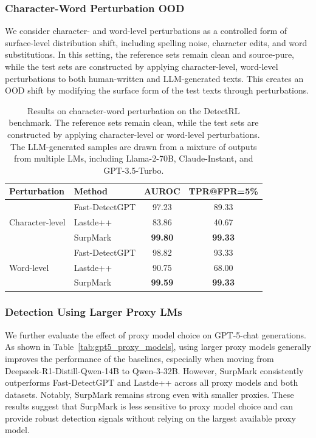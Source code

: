 \documentclass{article}
\theoremstyle{plain}
\theoremstyle{definition}
\theoremstyle{remark}
\begin{document}
\subsubsection{\quad Character-Word Perturbation OOD}
\label{app:cw-perturbation-ood}
We consider character- and word-level perturbations as a controlled form of surface-level distribution shift, including spelling noise, character edits, and word substitutions. In this setting, the reference sets remain clean and source-pure, while the test sets are constructed by applying character-level, word-level perturbations to both human-written and LLM-generated texts. This creates an OOD shift by modifying the surface form of the test texts through perturbations.

\begin{table}[htbp]
\centering
\scriptsize
\caption{Results on character-word perturbation on the DetectRL benchmark. The reference sets remain clean, while the test sets are constructed by applying character-level or word-level perturbations. The LLM-generated samples are drawn from a mixture of outputs from multiple LMs, including Llama-2-70B, Claude-Instant, and GPT-3.5-Turbo.}
\label{table:char_word_perturbation}
\begin{tabular}{llcc}
\toprule
Perturbation & Method & AUROC & TPR@FPR=5\% \\
\midrule
\multirow{3}{*}{Character-level}
& Fast-DetectGPT & 97.23 & 89.33 \\
& Lastde++ & 83.86 & 40.67 \\
& SurpMark & \textbf{99.80} & \textbf{99.33} \\
\midrule
\multirow{3}{*}{Word-level}
& Fast-DetectGPT & 98.82 & 93.33 \\
& Lastde++ & 90.75 & 68.00 \\
& SurpMark & \textbf{99.59} & \textbf{99.33} \\
\bottomrule
\end{tabular}
\end{table}

\subsubsection{Detection Using Larger Proxy LMs}
We further evaluate the effect of proxy model choice on GPT-5-chat generations. 
As shown in Table~\ref{tab:gpt5_proxy_models}, using larger proxy models generally improves the performance of the baselines, especially when moving from Deepseek-R1-Distill-Qwen-14B to Qwen-3-32B. 
However, SurpMark consistently outperforms Fast-DetectGPT and Lastde++ across all proxy models and both datasets. 
Notably, SurpMark remains strong even with smaller proxies. 
These results suggest that SurpMark is less sensitive to proxy model choice and can provide robust detection signals without relying on the largest available proxy model.
\end{document}
